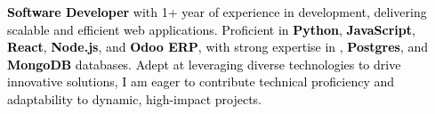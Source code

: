 
{\parskip=0pt
\noindent
\textcolor{black}{
\textbf{Software Developer} with 1+ year of experience in  development, delivering scalable and efficient web applications. Proficient in \textbf{Python}, \textbf{JavaScript}, \textbf{React}, \textbf{Node.js}, and \textbf{Odoo ERP}, with strong expertise in , \textbf{Postgres}, and \textbf{MongoDB} databases. Adept at leveraging diverse technologies to drive innovative solutions, I am eager to contribute technical proficiency and adaptability to dynamic, high-impact projects.
}
}

